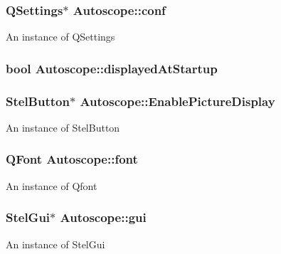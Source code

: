 \subsubsection[{\texorpdfstring{conf}{conf}}]{\setlength{\rightskip}{0pt plus 5cm}Q\+Settings$\ast$ Autoscope\+::conf\hspace{0.3cm}{\ttfamily [private]}}\hypertarget{class_autoscope_a6a17eb00225f765623844eaa9f80e71e}{}\label{class_autoscope_a6a17eb00225f765623844eaa9f80e71e}
An instance of Q\+Settings 
\subsubsection[{\texorpdfstring{displayed\+At\+Startup}{displayedAtStartup}}]{\setlength{\rightskip}{0pt plus 5cm}bool Autoscope\+::displayed\+At\+Startup\hspace{0.3cm}{\ttfamily [private]}}\hypertarget{class_autoscope_a8c066a069946815c05fe7d32b13211d3}{}\label{class_autoscope_a8c066a069946815c05fe7d32b13211d3}
\subsubsection[{\texorpdfstring{Enable\+Picture\+Display}{EnablePictureDisplay}}]{\setlength{\rightskip}{0pt plus 5cm}Stel\+Button$\ast$ Autoscope\+::\+Enable\+Picture\+Display\hspace{0.3cm}{\ttfamily [private]}}\hypertarget{class_autoscope_aa3b4663ded25875ce8fb21906b38d174}{}\label{class_autoscope_aa3b4663ded25875ce8fb21906b38d174}
An instance of Stel\+Button 
\subsubsection[{\texorpdfstring{font}{font}}]{\setlength{\rightskip}{0pt plus 5cm}Q\+Font Autoscope\+::font\hspace{0.3cm}{\ttfamily [private]}}\hypertarget{class_autoscope_a168d6d47f412a7966c2f5ddeb0f4cc79}{}\label{class_autoscope_a168d6d47f412a7966c2f5ddeb0f4cc79}
An instance of Qfont 
\subsubsection[{\texorpdfstring{gui}{gui}}]{\setlength{\rightskip}{0pt plus 5cm}Stel\+Gui$\ast$ Autoscope\+::gui\hspace{0.3cm}{\ttfamily [private]}}\hypertarget{class_autoscope_a90c44f576ab3acd74da3af3ad8162ca7}{}\label{class_autoscope_a90c44f576ab3acd74da3af3ad8162ca7}
An instance of Stel\+Gui 
